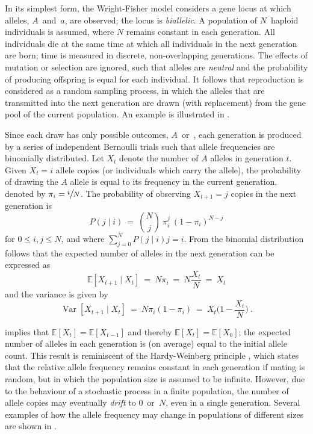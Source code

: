 %

%

In its simplest form, the Wright-Fisher model considers a gene locus at which  alleles, $A$~and~$a$, are observed; \ie the locus is \emph{biallelic}.
A population of $N$~haploid individuals is assumed, where $N$ remains constant in each generation.
All individuals die at the same time at which all individuals in the next generation are born; \ie time is measured in discrete, non-overlapping generations.
The effects of mutation or selection are ignored, such that alleles are \emph{neutral} and the probability of producing offspring is equal for each individual.
It follows that reproduction is considered as a random sampling process, in which the alleles that are transmitted into the next generation are drawn (with replacement) from the gene pool of the current population.
An example is illustrated in .

Since each draw has only  possible outcomes, $A$~or~, each generation is produced by a series of independent Bernoulli trials such that allele frequencies are binomially distributed.
Let $X_t$ denote the number of $A$ alleles in generation $t$.
Given ${X_t=i}$ allele copies (or individuals which carry the allele),
the probability of drawing the $A$ allele is equal to its frequency in the current generation, denoted by ${\pi_i = \large \sfrac{i}{N}}$.
The probability of observing ${X_{t+1}=j}$ copies in the next generation is
\begin{equation}\label{eq:WFprob}
	P(j \mid i) ~=~ {{N}\choose{j}} ~ \pi_i^j ~ (1 - \pi_i)^{N-j}
\end{equation}
for ${0 \leq i,j \leq N}$, and where ${\sum_{j=0}^{N} P(j \mid i) j = i}$.
From the binomial distribution follows that the expected number of alleles in the next generation can be expressed as
\begin{equation}\label{eq:WFexp}
	\mathbb{E}[X_{t+1} \mid X_{t}] ~=~ N \pi_i ~=~ N \frac{X_t}{N} ~=~ X_t
\end{equation}
and the variance is given by
\begin{equation}\label{eq:WFvar}
	\operatorname{Var}[X_{t+1} \mid X_{t}] ~=~ N \pi_i (1 - \pi_i) ~=~ X_t \Big( 1 - \frac{X_t}{N} \Big)
	\ \text{.}
\end{equation}

 implies that ${\mathbb{E}[X_t] = \mathbb{E}[X_{t-1}]}$ and thereby ${\mathbb{E}[X_t] = \mathbb{E}[X_0]}$; \ie the expected number of alleles in each generation is (on average) equal to the initial allele count.
This result is reminiscent of the Hardy-Weinberg principle \citep{Hardy:1908wx,Weinberg:1908tr}, which states that the relative allele frequency remains constant in each generation if mating is random, but in which the population size is assumed to be infinite.
However, due to the behaviour of a stochastic process in a finite population, the number of allele copies may eventually \emph{drift} to $0$~or~$N$, even in a single generation.
Several examples of how the allele frequency may change in populations of different sizes are shown in .

